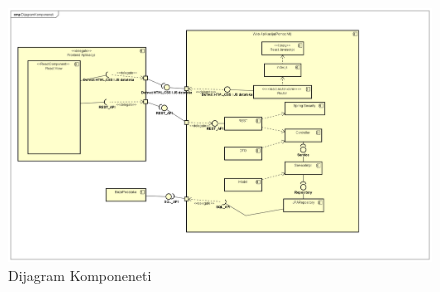 		\begin{figure}[H]
			\includegraphics[scale=0.3]{slike/Dijagram Komponeneti.png} %
			\centering
			\caption { Dijagram Komponeneti}
			\label{fig:4.14}
			\end{figure}
			

